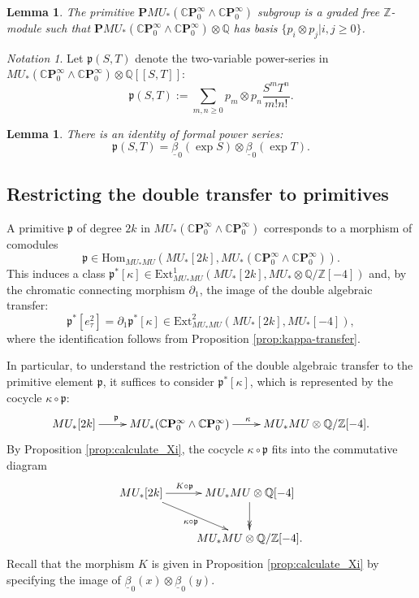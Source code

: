 \documentclass[10pt,a4paper]{amsart}
\newtheorem{lem}[thm]{Lemma}
\theoremstyle{definition}
\theoremstyle{remark}
\newtheorem{nota}[thm]{Notation}
\newcommand{\qz}{{\rat/\zed}}
\newcommand{\primel}{\mathfrak{p}}
\newcommand{\prim}{\mathbf{P}}
\renewcommand{\hom}{\mathrm{Hom}}
\newcommand{\ext}{\mathrm{Ext}}
\newcommand{\zed}{\mathbb{Z}}
\newcommand{\rat}{\mathbb{Q}}
\newcommand{\cp}{\mathbb{C} \mathbf{P}^\infty}
\renewcommand{\smash}{\wedge}
\begin{document}
\begin{lem}
\label{lem:identify-primitives}
	The primitive $\prim MU_* (\cp_0 \smash \cp_0)$ subgroup is a graded free
$\zed$-module such that $\prim MU_* (\cp_0 \smash \cp_0) \otimes \rat$ has
basis $\{ p_i \otimes p_j | i, j \geq 0 \}$.
\end{lem}



\begin{nota}
\label{nota:primel}
 Let $\primel (S, T) $ denote the two-variable power-series in $MU_* (\cp_0\smash \cp_0 ) \otimes \rat [[S, T]]$:
\[
\primel(S, T):= \sum_{m,n \geq 0} p_m \otimes p_n \frac{S^m T^n}{m! n !}.
\]
\end{nota}



\begin{lem}
 \label{lem:identify_primel}
There is an identity of formal power series:
\[
 \primel(S, T) = \underline{\beta}_0 (\exp S) \otimes \underline{\beta}_0 (\exp T).
\]
\end{lem}



\subsection{Restricting the double transfer to primitives}
\label{subsect:primitive_double_transfer}

 A primitive $\primel$ of degree $2k$ in $MU_* (\cp_0 \smash \cp_0)$ corresponds to
a morphism of comodules
\[
\primel \in
\hom_{MU_* MU}(MU_* [2k] , MU_* (\cp_0 \smash \cp_0)).
\]
This induces a class $\primel^* [\kappa] \in \ext^1_{MU_*MU} (MU_* [2k] , MU_* \otimes \qz [-4])$ and, by the chromatic connecting morphism $\partial_1$, the image of the double algebraic transfer:
\[
	\primel ^* [e_\tau^2] = \partial_1 \primel^*  [\kappa] \in \ext^2 _{MU_*MU} (MU_*[2k] , MU_* [-4]),
\]
where the identification follows from Proposition \ref{prop:kappa-transfer}.


In particular, to understand the restriction of the double algebraic transfer to the primitive element $\primel$, it suffices to consider $\primel^*  [\kappa]$,
which is represented by the cocycle $\kappa\circ \primel$:
\[
\xymatrix{
	MU_* [2k]
\ar[r]^(.4){\primel}
&
MU_*(\cp_0 \smash \cp_0 )
\ar[r]
^\kappa
&
MU_* MU \otimes \qz [-4].
}
\]
By Proposition \ref{prop:calculate_Xi},  the cocycle $\kappa\circ \primel$ fits
 into the commutative diagram
\[
\xymatrix{
	MU_* [2k]
\ar[r]^(.4){K \circ \primel}
\ar[rd]_{\kappa \circ \primel}
&
MU_*MU \otimes \rat [-4]
\ar@{->>}[d]
\\
&
MU_* MU \otimes \qz [-4].
}
\]
Recall that the morphism $K$ is given in Proposition \ref{prop:calculate_Xi} by specifying the image of $\underline{\beta}_0 (x) \otimes \underline{\beta}_0 (y)$.
\end{document}
